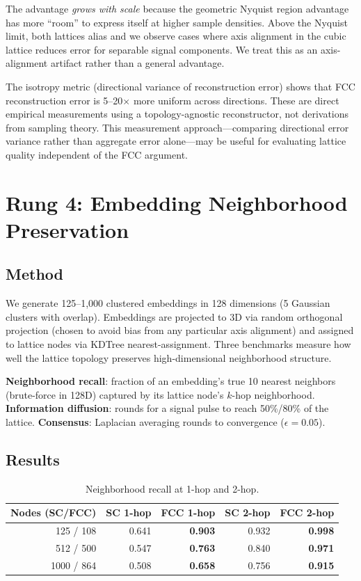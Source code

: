 \documentclass[11pt]{article}
\begin{document}
The advantage \emph{grows with scale} because the geometric
Nyquist region advantage has more ``room'' to express itself at
higher sample densities. Above the Nyquist limit, both lattices
alias and we observe cases where axis alignment in the cubic lattice
reduces error for separable signal components. We treat this as an
axis-alignment artifact rather than a general advantage.

The isotropy metric (directional variance of reconstruction error)
shows that FCC reconstruction error is 5--20$\times$ more uniform
across directions. These are direct empirical measurements using a
topology-agnostic reconstructor, not derivations from sampling
theory. This measurement approach---comparing directional error
variance rather than aggregate error alone---may be useful for
evaluating lattice quality independent of the FCC argument.

\section{Rung 4: Embedding Neighborhood Preservation}
\label{sec:embed}

\subsection{Method}

We generate 125--1{,}000 clustered embeddings in 128 dimensions
(5 Gaussian clusters with overlap). Embeddings are projected to 3D
via random orthogonal projection (chosen to avoid bias from any
particular axis alignment) and assigned to lattice nodes via
KDTree nearest-assignment. Three benchmarks measure how well the
lattice topology preserves high-dimensional neighborhood structure.

\textbf{Neighborhood recall}: fraction of an embedding's true 10
nearest neighbors (brute-force in 128D) captured by its lattice
node's $k$-hop neighborhood. \textbf{Information diffusion}: rounds
for a signal pulse to reach 50\%/80\% of the lattice.
\textbf{Consensus}: Laplacian averaging rounds to convergence
($\epsilon = 0.05$).

\subsection{Results}

\begin{table}[H]
\centering
\caption{Neighborhood recall at 1-hop and 2-hop.}
\label{tab:recall}
\begin{tabular}{rrrrr}
\toprule
Nodes (SC/FCC) & SC 1-hop & FCC 1-hop & SC 2-hop & FCC 2-hop \\
\midrule
125 / 108   & 0.641 & \textbf{0.903} & 0.932 & \textbf{0.998} \\
512 / 500   & 0.547 & \textbf{0.763} & 0.840 & \textbf{0.971} \\
1000 / 864  & 0.508 & \textbf{0.658} & 0.756 & \textbf{0.915} \\
\bottomrule
\end{tabular}
\end{table}
\end{document}
